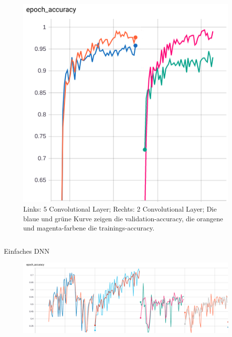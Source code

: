 \documentclass[aspectratio=1610, 9pt]{beamer}
\begin{document}
\begin{frame}
\begin{columns}
\begin{figure}
      \centering
      \includegraphics[scale=0.4]{images/models.png}     
      \caption{Links: 5 Convolutional Layer; Rechts: 2 Convolutional Layer; Die blaue und grüne Kurve zeigen die validation-accuracy, die orangene und magenta-farbene die trainings-accuracy.}
      \label{fig:acc}
    \end{figure}

\end{columns}

\end{frame}



\begin{frame}{Einfaches DNN}

  \centering
  \hspace{-1.3cm}

  \begin{figure}
    \centering
    \includegraphics[scale=0.3]{images/dnn.png}
  \end{figure}
  
\end{frame}
\end{document}
